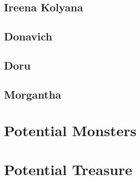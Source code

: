 \documentclass[a4paper,11pt]{article}
\begin{document}
\subsection{Ireena Kolyana}
\subsection{Donavich}
\subsection{Doru}
\subsection{Morgantha}

\pagebreak
\section{Potential Monsters}
\label{sec:PotentialMonsters}

\pagebreak
\section{Potential Treasure}
\label{sec:PotentialTreasure}
\end{document}
